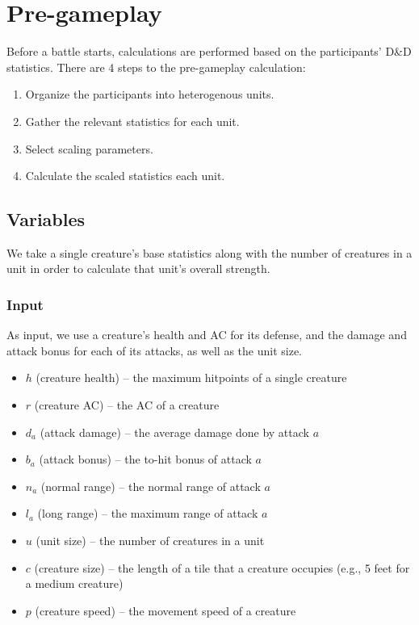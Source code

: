 \section{Pre-gameplay}\label{sec:pregame}

Before a battle starts,
calculations are performed based on the participants' D\&D statistics.
There are 4 steps to the pre-gameplay calculation:

\begin{enumerate}
    \item Organize the participants into heterogenous units.
    \item Gather the relevant statistics for each unit.
    \item Select scaling parameters.
    \item Calculate the scaled statistics each unit.
\end{enumerate}






\subsection{Variables}

We take a single creature's base statistics along with the number of creatures in a unit
in order to calculate that unit's overall strength.

\subsubsection{Input}

As input, we use a creature's health and AC for its defense,
and the damage and attack bonus for each of its attacks,
as well as the unit size.

\begin{itemize}
    \item $h$ (creature health) -- the maximum hitpoints of a single creature
    \item $r$ (creature AC) -- the AC of a creature
    \item $d_a$ (attack damage) -- the average damage done by attack $a$
    \item $b_a$ (attack bonus) -- the to-hit bonus of attack $a$
    \item $n_a$ (normal range) -- the normal range of attack $a$
    \item $l_a$ (long range) -- the maximum range of attack $a$
    \item $u$ (unit size) -- the number of creatures in a unit
    \item $c$ (creature size) -- the length of a tile that a creature occupies
        (e.g., 5 feet for a medium creature)
    \item $p$ (creature speed) -- the movement speed of a creature
\end{itemize}

